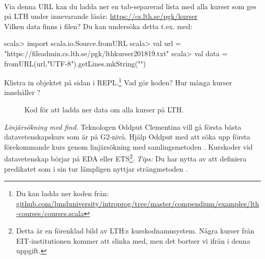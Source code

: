 \QUESTEND





\QUESTBEGIN

\Task \label{task:linsearch-lth}\what~

\Subtask Via denna URL kan du ladda ner en tab-separerad lista med alla kurser som ges på LTH under innevarande läsår: \url{https://cs.lth.se/pgk/kurser} \\Vilken data finns i filen? Du kan undersöka detta t.ex. med:
\begin{REPLnonum}
scala> import scala.io.Source.fromURL
scala> val url = "https://fileadmin.cs.lth.se/pgk/lthkurser201819.txt"
scala> val data = fromURL(url,"UTF-8").getLines.mkString("\n")
\end{REPLnonum}

\Subtask \label{subtask:download-lthcourses} Klistra in objektet  på sidan \pageref{lth-courses} i REPL.\footnote{Du kan ladda ner koden från: \\ \href{https://raw.githubusercontent.com/lunduniversity/introprog/master/compendium/examples/lth-courses/courses.scala}{github.com/lunduniversity/introprog/tree/master/compendium/examples/lth-courses/courses.scala}} Vad gör koden? Hur många kurser innehåller ?

\begin{figure}[h]
  \caption{Kod för att ladda ner data om alla kurser på LTH.}
  \label{lth-courses}
\end{figure}


\Subtask \emph{Linjärsökning med find.} Teknologen Oddput Clementina vill gå första bästa datavetenskapskurs som är på G2-nivå. Hjälp Oddput med att söka upp första förekommande kurs genom linjärsökning med samlingsmetoden . Kurskoder vid datavetenskap börjar på EDA eller ETS\footnote{Detta är en förenklad bild av LTH:s kurskodnamnsystem. Några kurser från EIT-institutionen  kommer att slinka med, men det bortser vi ifrån i denna uppgift.}. \emph{Tips:} Du har nytta av att definiera predikatet  som i sin tur lämpligen nyttjar strängmetoden .

